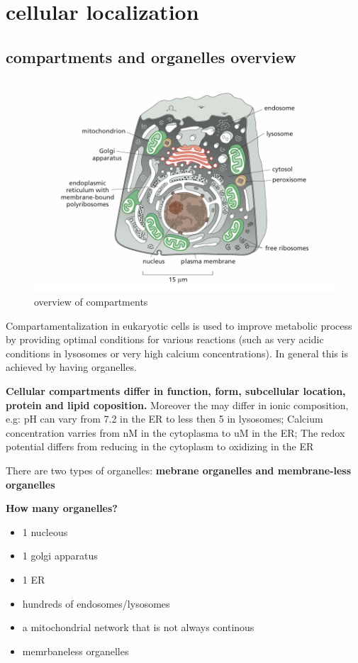 \documentclass[../main.tex]{subfiles}
\begin{document}
\section{cellular localization}

\subsection{compartments and organelles overview}
\begin{figure}[H]
    \centering
    \includegraphics[width=0.5\linewidth]{compartmentOverview.png}
    \caption{overview of compartments}
    \label{fig:enter-label}
\end{figure}
    Compartamentalization in eukaryotic cells is used to improve metabolic process by providing optimal conditions for various reactions (such as very acidic conditions in lysosomes or very high calcium concentrations). In general this is achieved by having organelles.
    \par
    \textbf{Cellular compartments differ in function, form, subcellular location, protein and lipid coposition.} Moreover the may differ in ionic composition, e.g: pH can vary from 7.2 in the ER to less then 5 in lysosomes; Calcium concentration varries from nM in the cytoplasma to uM in the ER; The redox potential differs from reducing in the cytoplasm to oxidizing in the ER
    \par
    There are two types of organelles: \textbf{mebrane organelles and membrane-less organelles}

    \textbf{How many organelles?}

    \begin{itemize}
        \item 1 nucleous
        \item 1 golgi apparatus
        \item 1 ER
        \item hundreds of endosomes/lysosomes
        \item a mitochondrial network that is not always continous 
        \item memrbaneless organelles 
        
    \end{itemize}
\end{document}
